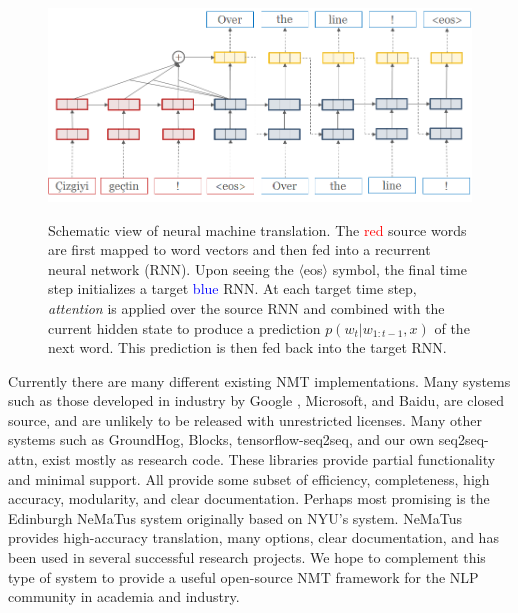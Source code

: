 \documentclass[11pt]{article}
\begin{document}
\begin{figure}
  \centering
  \includegraphics[width=\linewidth]{simple-attn}
  \label{fig:rnn}
  \caption{\small Schematic view of neural machine translation. The \textcolor{red}{red} source words are first mapped to word vectors and then fed into a recurrent neural network (RNN). Upon seeing the $\langle$eos$\rangle$ symbol, the final time step initializes a target \textcolor{blue}{blue} RNN. At each target time step, \textit{attention} is applied over the source RNN and combined with the current hidden state to produce a prediction $p(w_t| w_{1: t-1}, x)$ of the next word. This prediction is then fed back into the target RNN.}
\end{figure}


Currently there are many different existing NMT implementations. Many
systems such as those developed in industry by Google
\cite{wu2016google}, Microsoft, and Baidu, are closed source, and are
unlikely to be released with unrestricted licenses. Many other systems
such as GroundHog, Blocks, tensorflow-seq2seq, and our own
seq2seq-attn, exist mostly as research code. These libraries provide
partial functionality and minimal support. All provide some subset of
efficiency, completeness, high accuracy, modularity, and clear
documentation. Perhaps most promising is the Edinburgh NeMaTus system
originally based on NYU's system. NeMaTus provides high-accuracy
translation, many options, clear documentation, and has been used in
several successful research projects. We hope to complement this type
of system to provide a useful open-source NMT framework for the
NLP community in academia and industry.
\end{document}
